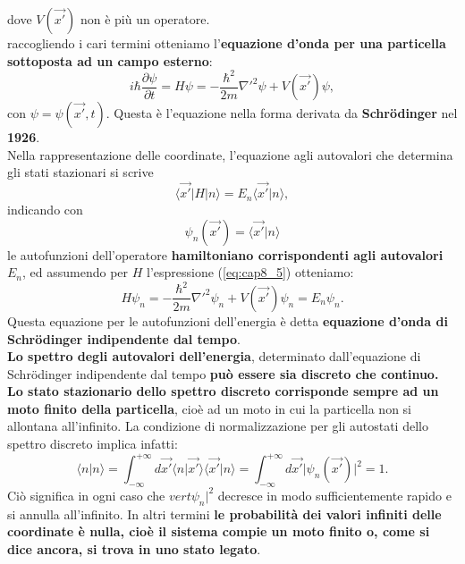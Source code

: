 dove $V(\vec{x'})$ non è più un operatore.\\
raccogliendo i cari termini otteniamo l'\textbf{equazione d'onda per una particella sottoposta ad un campo esterno}:
\begin{equation}
i\hbar \frac{\partial \psi}{\partial t} = H\psi = -\frac{\hbar ^2}{2m}{\nabla '} ^2 \psi + V(\vec{x'}) \psi,
\end{equation}
con $\psi =\psi(\vec{x'}, t)$. Questa è l'equazione nella forma derivata da \textbf{Schr\"{o}dinger} nel \textbf{1926}.\\
Nella rappresentazione delle coordinate, l'equazione agli autovalori che determina gli stati stazionari si scrive
\begin{equation}
\langle \vec{x'}\vert H \vert n \rangle = E_n\langle \vec{x'} \vert n \rangle,
\end{equation}
indicando con
\begin{equation}
\psi _n (\vec{x'}) = \langle \vec{x'} \vert n \rangle
\end{equation}
le autofunzioni dell'operatore \textbf{hamiltoniano corrispondenti agli autovalori $E_n$}, ed assumendo per $H$ l'espressione (\ref{eq:cap8_5}) otteniamo:
\begin{equation}
H\psi _n = -\frac{\hbar ^ 2}{2m}{\nabla '}^2 \psi _n + V(\vec{x'})\psi _n = E_n \psi _n.
\end{equation}
Questa equazione per le autofunzioni dell'energia è detta \textbf{equazione d'onda di Schr\"{o}dinger indipendente dal tempo}.\\
\textbf{Lo spettro degli autovalori dell'energia}, determinato dall'equazione di Schr\"{o}dinger indipendente dal tempo \textbf{può essere sia discreto che continuo. Lo stato stazionario dello spettro discreto corrisponde sempre ad un moto finito della particella}, cioè ad un moto in cui la particella non si allontana all'infinito. La condizione di normalizzazione per gli autostati dello spettro discreto implica infatti:
\begin{equation}
\langle n \vert n \rangle = \int _{- \infty} ^{+\infty} d\vec{x'}\langle n \vert \vec{x'} \rangle \langle \vec{x'} \vert n \rangle = \int _{- \infty} ^{+\infty} d\vec{x'} \vert \psi _n (\vec{x'}) \vert ^2 =1.
\end{equation}
Ciò significa in ogni caso che $ vert \psi _n  \vert ^2$ decresce in modo sufficientemente rapido e si annulla all'infinito. In altri termini \textbf{le probabilità dei valori infiniti delle coordinate è nulla, cioè il sistema compie un moto finito o, come si dice ancora, si trova in uno stato legato}.\\
